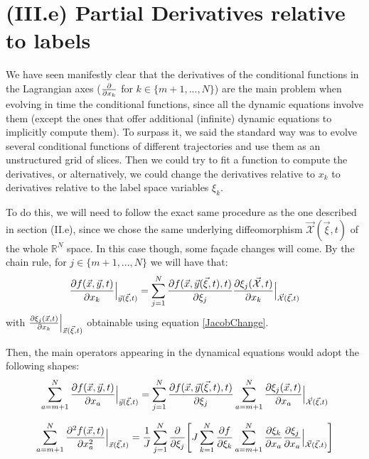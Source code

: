 \documentclass[11pt, a4paper]{article} %
\newcommand{\R}{\mathbb{R}} %
\newcommand{\x}{\mathcal{X}}
\begin{document}
\newpage
\section*{(III.e) Partial Derivatives relative to labels\vspace{-0.1cm}}
We have seen manifestly clear that the derivatives of the conditional functions in the Lagrangian axes ($\pdv{}{x_k}$ for $k\in\{m+1,...,N \}$) are the main problem when evolving in time the conditional functions, since all the dynamic equations involve them (except the ones that offer additional (infinite) dynamic equations to implicitly compute them). To surpass it, we said the standard way was to evolve several conditional functions of different trajectories and use them as an unstructured grid of slices. Then we could try to fit a function to compute the derivatives, or alternatively, we could change the derivatives relative to $x_k$ to derivatives relative to the label space variables $\xi_k$.

To do this, we will need to follow the exact same procedure as the one described in section (II.e), since we chose the same underlying diffeomorphism $\vec{\x}(\vec{\xi},t)$ of the whole $\R^N$ space. In this case though, some façade changes will come. By the chain rule, for $j\in\{m+1,...,N \}$ we will have that:
\begin{equation}
\pdv{f(\vec{x}, \vec{y},t)}{x_k}\Big\rvert_{\vec{y}(\vec{\xi},t)}=\sum_{j=1}^N \pdv{f(\vec{x},\vec{y}(\vec{\xi},t),t)}{\xi_j} \pdv{\xi_j(\vec{\x},t)}{x_k}\Big\rvert_{\vec{\x}(\vec{\xi},t)}
\end{equation}
with $\pdv{\xi_j(\vec{x},t)}{x_k}\Big\rvert_{\vec{x}(\vec{\xi},t)}$ obtainable using equation \eqref{JacobChange}.

Then, the main operators appearing in the dynamical equations would adopt the following shapes:
\begin{equation}
\sum_{a=m+1}^N \pdv{f(\vec{x}, \vec{y},t)}{x_a}\Big\rvert_{\vec{y}(\vec{\xi},t)} = \sum_{j=1}^N \pdv{f(\vec{x}, \vec{y}(\vec{\xi},t),t)}{\xi_j} \sum_{a=m+1}^N \pdv{\xi_j(\vec{x},t)}{x_a}\Big\rvert_{\vec{\x}(\vec{\xi},t)}
\end{equation}

\begin{equation}
\sum_{a=m+1}^N \pdv[2]{f(\vec{x},t)}{x_a}\Big\rvert_{\vec{x}(\vec{\xi},t)}=\frac{1}{J} \sum_{j=1}^N\pdv{}{\xi_j} \qty[ J\sum_{k=1}^N\pdv{f}{\xi_k}\sum_{a=m+1}^N\pdv{\xi_k}{x_a}\pdv{\xi_j}{x_a}\Big\rvert_{\vec{\x}(\vec{\xi},t)}]
\end{equation}
\end{document}
